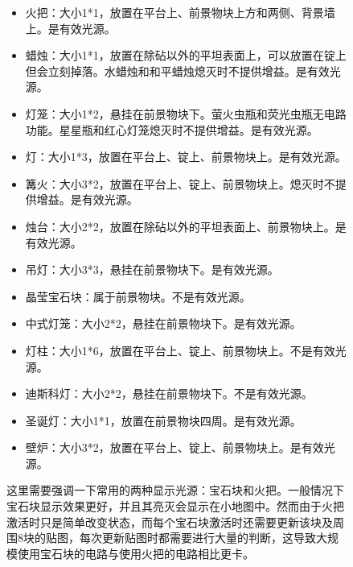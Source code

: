 \begin{figure}[!ht]
\begin{itemize}
\item 火把：大小1*1，放置在平台上、前景物块上方和两侧、背景墙上。是有效光源。
\item 蜡烛：大小1*1，放置在除砧以外的平坦表面上，可以放置在锭上但会立刻掉落。水蜡烛和和平蜡烛熄灭时不提供增益。是有效光源。
\item 灯笼：大小1*2，悬挂在前景物块下。萤火虫瓶和荧光虫瓶无电路功能。星星瓶和红心灯笼熄灭时不提供增益。是有效光源。
\item 灯：大小1*3，放置在平台上、锭上、前景物块上。是有效光源。
\item 篝火：大小3*2，放置在平台上、锭上、前景物块上。熄灭时不提供增益。是有效光源。
\item 烛台：大小2*2，放置在除砧以外的平坦表面上、前景物块上。是有效光源。
\item 吊灯：大小3*3，悬挂在前景物块下。是有效光源。
\item 晶莹宝石块：属于前景物块。不是有效光源。
\item 中式灯笼：大小2*2，悬挂在前景物块下。是有效光源。
\item 灯柱：大小1*6，放置在平台上、锭上、前景物块上。不是有效光源。
\item 迪斯科灯：大小2*2，悬挂在前景物块下。不是有效光源。
\item 圣诞灯：大小1*1，放置在前景物块四周。是有效光源。
\item 壁炉：大小3*2，放置在平台上、锭上、前景物块上。是有效光源。
\end{itemize}

这里需要强调一下常用的两种显示光源：宝石块和火把。一般情况下宝石块显示效果更好，并且其亮灭会显示在小地图中。然而由于火把激活时只是简单改变状态，而每个宝石块激活时还需要更新该块及周围8块的贴图，每次更新贴图时都需要进行大量的判断，这导致大规模使用宝石块的电路与使用火把的电路相比更卡。


\end{figure}
